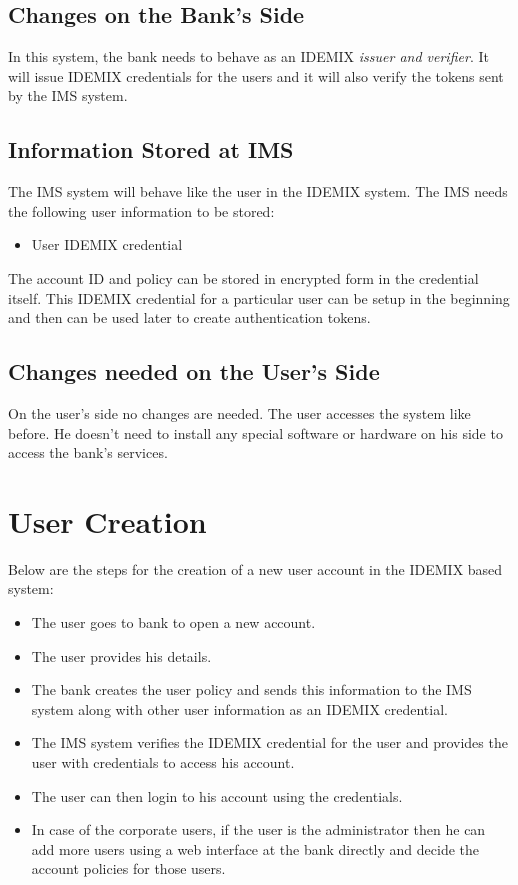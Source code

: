 \subsection{Changes on the Bank's Side}
In this system, the bank needs to behave as an IDEMIX \textit{issuer and verifier}. It will issue IDEMIX credentials for the users and it will also verify the tokens sent by the IMS system. 
\subsection{Information Stored at IMS}
The IMS system will behave like the user in the IDEMIX system. The IMS needs the following user information to be stored:
\begin{itemize}
	\item User IDEMIX credential
\end{itemize}
The account ID and policy can be stored in encrypted form in the credential itself. This IDEMIX credential for a particular user can be setup in the beginning and then can be used later to create authentication tokens.
\subsection{Changes needed on the User's Side}
On the user's side no changes are needed. The user accesses the system like before. He doesn't need to install any special software or hardware on his side to access the bank's services. 
\section{User Creation}
Below are the steps for the creation of a new user account in the IDEMIX based system:
\begin{itemize}
	\item The user goes to bank to open a new account.
	\item The user provides his details.
	\item The bank creates the user policy and sends this information to the IMS system along with other user information as an IDEMIX credential.
	\item The IMS system verifies the IDEMIX credential for the user and provides the user with credentials to access his account.
	\item The user can then login to his account using the credentials.
	\item In case of the corporate users, if the user is the administrator then he can add more users using a web interface at the bank directly and decide the account policies for those users.
\end{itemize}
